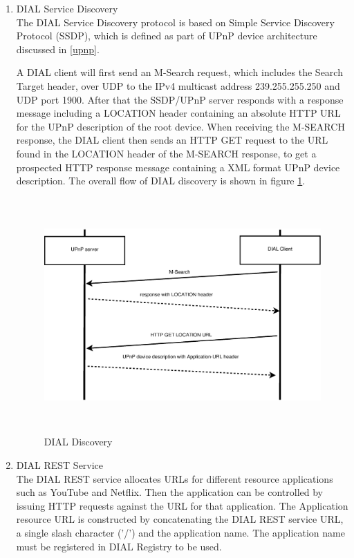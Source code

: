\begin{enumerate} 
\item DIAL Service Discovery \\ 
The DIAL Service Discovery protocol is based on Simple Service Discovery 
Protocol (SSDP), which is defined as part of UPnP device architecture discussed 
in \ref{upnp}. 

A DIAL client will first send an M-Search request, which includes  the Search Target 
header, over UDP to the IPv4 multicast address 239.255.255.250 and UDP port 1900. After that the SSDP/UPnP server responds with a response message including a LOCATION header 
containing an absolute HTTP URL for the UPnP description of the root device. 
When receiving the M-SEARCH response, the DIAL client then sends an HTTP GET 
request to the URL found in the LOCATION header of the M-SEARCH response, to 
get a prospected HTTP response message containing a XML format UPnP device description. The 
overall flow of DIAL discovery is shown in figure \ref{dial_discovery}. 

\begin{figure}[htb] \centering 
\includegraphics[height=9cm]{charts/dial_discovery} 
\caption{DIAL Discovery \label{dial_discovery}} 
\end{figure} 

\item DIAL REST Service \\ 
The DIAL REST service allocates URLs for different resource applications such as 
YouTube and Netflix. Then the application can be controlled by issuing HTTP 
requests against the URL for that application. The Application resource URL is 
constructed by concatenating the DIAL REST service URL, a single slash character 
('/') and the application name. The application name must be registered in DIAL 
Registry to be used. 


\end{enumerate}
